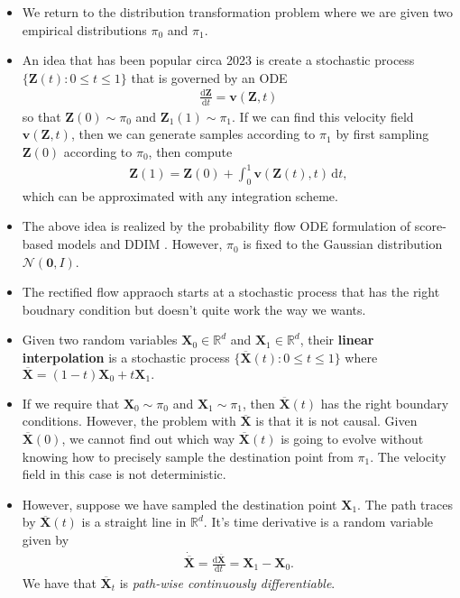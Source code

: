 \documentclass[10pt]{article}
\newcommand{\dee}{\mathrm{d}}
\newcommand{\ve}[1]{\mathbf{#1}}
\newcommand{\mcal}[1]{\mathcal{#1}}
\newcommand{\Real}{\mathbb{R}}
\begin{document}
\begin{itemize}
  \item We return to the distribution transformation problem where we are given two empirical distributions $\pi_0$ and $\pi_1$.
  
  \item An idea that has been popular circa 2023 is create a stochastic process $\{ \ve{Z}(t) : 0 \leq t \leq 1 \}$ that is governed by an ODE
  \begin{align} \label{eqn:transformation-ode}
    \frac{\dee \ve{Z}}{\dee t} = \ve{v}(\ve{Z}, t) 
  \end{align}
  so that $\ve{Z}(0) \sim \pi_0$ and $\ve{Z}_1(1) \sim \pi_1$. If we can find this velocity field $\ve{v}(\ve{Z}, t)$, then we can generate samples according to $\pi_1$ by first sampling $\ve{Z}(0)$ according to $\pi_0$, then compute
  \begin{align*}
    \ve{Z}(1) = \ve{Z}(0) + \int_{0}^1 \ve{v}(\ve{Z}(t), t)\, \dee t,
  \end{align*}
  which can be approximated with any integration scheme. 
  
  \item The above idea is realized by the probability flow ODE formulation of score-based models \cite{Song:2021} and DDIM \cite{Song:DDIM:2020}. However, $\pi_0$ is fixed to the Gaussian distribution $\mcal{N}(\ve{0},I)$.
  
  \item The rectified flow appraoch starts at a stochastic process that has the right boudnary condition but doesn't quite work the way we wants.

  \item Given two random variables $\ve{X}_0 \in \Real^d$ and $\ve{X}_1 \in \Real^d$, their {\bf linear interpolation} is a stochastic process $\{ \overline{\ve{X}}(t) : 0 \leq t \leq 1 \}$ where $\overline{\ve{X}} = (1-t)\ve{X}_0 + t\ve{X}_1.$ 
  
  \item If we require that $\ve{X}_0 \sim \pi_0$ and $\ve{X}_1 \sim \pi_1$, then $\overline{\ve{X}}(t)$ has the right boundary conditions. However, the problem with $\overline{\ve{X}}$ is that it is not causal. Given $\overline{\ve{X}}(0)$, we cannot find out which way $\overline{\ve{X}}(t)$ is going to evolve without knowing how to precisely sample the destination point from $\pi_1$. The velocity field in this case is not deterministic.
  
  \item However, suppose we have sampled the destination point $\ve{X}_1$. The path traces by $\overline{\ve{X}}(t)$ is a straight line in $\Real^d$. It's time derivative is a random variable given by
  \begin{align*}
    \dot{\overline{\ve{X}}} = \frac{\dee \overline{\ve{X}}}{\dee t} = \ve{X}_1 - \ve{X}_0.
  \end{align*}
  We have that $\overline{\ve{X}}_t$ is \emph{path-wise continuously differentiable}.


\end{itemize}
\end{document}
